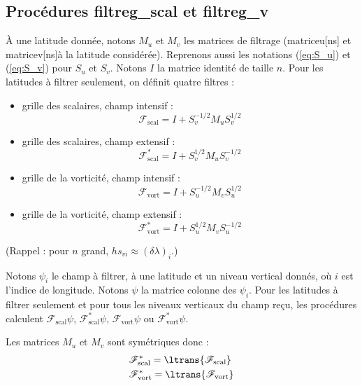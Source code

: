 \documentclass[a4paper,english,french]{article}
\begin{document}
\subsection{Procédures filtreg\_scal et filtreg\_v}

\`A une latitude donnée, notons $M_u$ et $M_v$ les matrices de
filtrage (matriceu[ns] et matricev[ns]à la latitude
considérée). Reprenons aussi les notations (\ref{eq:S_u}) et
(\ref{eq:S_v}) pour $S_u$ et $S_v$. Notons $I$ la matrice identité de
taille $n$. Pour les latitudes à filtrer seulement, on définit quatre
filtres :
\begin{itemize}
\item grille des scalaires, champ intensif :
  \begin{equation}
    \label{eq:filter_scal_intensive}
    \mathscr{F}_\mathrm{scal} = I + S_v^{-1/2} M_u S_v^{1/2}
  \end{equation}
\item grille des scalaires, champ extensif :
  \begin{equation}
    \label{eq:filter_scal_extensive}
    \mathscr{F}^*_\mathrm{scal} = I + S_v^{1/2} M_u S_v^{- 1/2}
  \end{equation}
\item grille de la vorticité, champ intensif :
  \begin{equation}
    \label{eq:filter_vort_intensive}
    \mathscr{F}_\mathrm{vort} = I + S_u^{-1/2} M_v S_u^{1/2}
  \end{equation}
\item grille de la vorticité, champ extensif :
  \begin{equation}
    \label{eq:filter_vort_extensive}
    \mathscr{F}^*_\mathrm{vort} = I + S_u^{1/2} M_v S_u^{- 1/2}
  \end{equation}
\end{itemize}
(Rappel : pour $n$ grand, $h s_{vi} \approx (\delta \lambda)_i$.)

Notons $\psi_i$ le champ à filtrer, à une latitude et un niveau
vertical donnés, où $i$ est l'indice de longitude. Notons $\psi$ la
matrice colonne des $\psi_i$. Pour les latitudes à filtrer seulement
et pour tous les niveaux verticaux du champ reçu, les procédures
calculent $\mathscr{F}_\mathrm{scal} \psi$,
$\mathscr{F}_\mathrm{scal}^* \psi$, $\mathscr{F}_\mathrm{vort} \psi$
ou $\mathscr{F}_\mathrm{vort}^* \psi$.

Les matrices $M_u$ et $M_v$ sont symétriques donc :
\begin{align*}
  & \mathscr{F}^*_\mathrm{scal} = \ltrans{\mathscr{F}_\mathrm{scal}} \\
  & \mathscr{F}^*_\mathrm{vort} = \ltrans{\mathscr{F}_\mathrm{vort}}
\end{align*}
\end{document}
